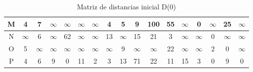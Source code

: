 \documentclass[12pt]{article}
\begin{document}
\begin{table}[h!]
\begin{tabular}{|c|c|c|c|c|c|c|c|c|c|c|c|c|c|c|c|c|}
M & 4 & 7 & $\infty$ & $\infty$ & $\infty$ & $\infty$ & 4 & 5 & 9 & 100 & 55 & $\infty$ & 0 & $\infty$ & 25 & $\infty$ \\\hline
N & $\infty$ & 6 & $\infty$ & 62 & $\infty$ & $\infty$ & 13 & $\infty$ & 15 & 21 & 3 & $\infty$ & $\infty$ & 0 & $\infty$ & $\infty$ \\\hline
O & 5 & $\infty$ & $\infty$ & $\infty$ & $\infty$ & $\infty$ & $\infty$ & 9 & $\infty$ & $\infty$ & 22 & $\infty$ & $\infty$ & 2 & 0 & $\infty$ \\\hline
P & 4 & 6 & 9 & 0 & 11 & 2 & 3 & 13 & 71 & 22 & 11 & 15 & 3 & 0 & 9 & 0 \\\hline
\end{tabular}
\caption{Matriz de distancias inicial D(0)}
\end{table}

\clearpage
\end{document}
